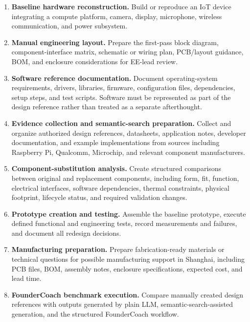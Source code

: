 \documentclass[12pt,letterpaper]{article}
\begin{document}
\begin{enumerate}
    \item \textbf{Baseline hardware reconstruction.}
    Build or reproduce an IoT device integrating a compute platform,
    camera, display, microphone, wireless communication, and power subsystem.

    \item \textbf{Manual engineering layout.}
    Prepare the first-pass block diagram, component-interface matrix,
    schematic or wiring plan, PCB/layout guidance, BOM, and enclosure
    considerations for EE-lead review.

    \item \textbf{Software reference documentation.}
    Document operating-system requirements, drivers, libraries, firmware,
    configuration files, dependencies, setup steps, and test scripts.
    Software must be represented as part of the design reference rather than
    treated as a separate afterthought.

    \item \textbf{Evidence collection and semantic-search preparation.}
    Collect and organize authorized design references, datasheets,
    application notes, developer documentation, and example implementations
    from sources including Raspberry Pi, Qualcomm, Microchip, and relevant
    component manufacturers.

    \item \textbf{Component-substitution analysis.}
    Create structured comparisons between original and replacement
    components, including form, fit, function, electrical interfaces,
    software dependencies, thermal constraints, physical footprint,
    lifecycle status, and required validation changes.

    \item \textbf{Prototype creation and testing.}
    Assemble the baseline prototype, execute defined functional and
    engineering tests, record measurements and failures, and document all
    redesign decisions.

    \item \textbf{Manufacturing preparation.}
    Prepare fabrication-ready materials or technical questions for possible
    manufacturing support in Shanghai, including PCB files, BOM,
    assembly notes, enclosure specifications, expected cost, and lead time.

    \item \textbf{FounderCoach benchmark execution.}
    Compare manually created design references with outputs generated by
    plain LLM, semantic-search-assisted generation, and the structured
    FounderCoach workflow.
\end{enumerate}
\end{document}
